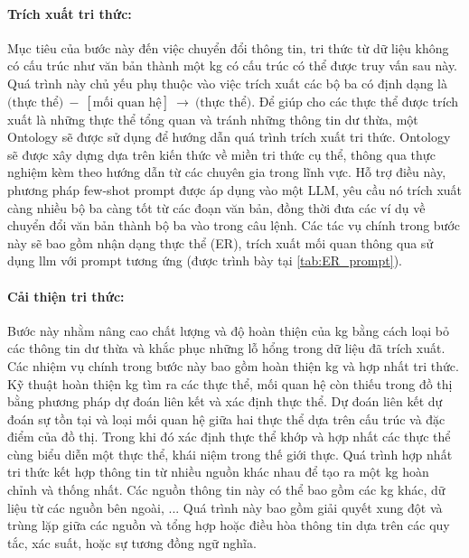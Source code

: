 \paragraph{Trích xuất tri thức:}
\label{paragraph:extract_knowledge}
Mục tiêu của bước này đến việc chuyển đổi thông tin, tri thức từ dữ liệu không có cấu trúc như văn bản thành một \gls{kg} có cấu trúc có thể được truy vấn sau này. Quá trình này chủ yếu phụ thuộc vào việc trích xuất các bộ ba có định dạng là \(
\text{(thực thể)} \ - \ \left[\text{mối quan hệ}\right] \ \rightarrow \ \text{(thực thể)}
\). Để giúp cho các thực thể được trích xuất là những thực thể tổng quan và tránh những thông tin dư thừa, một Ontology sẽ được sử dụng để hướng dẫn quá trình trích xuất tri thức. Ontology sẽ được xây dựng dựa trên kiến thức về miền tri thức cụ thể, thông qua thực nghiệm kèm theo hướng dẫn từ các chuyên gia trong lĩnh vực.
Hỗ trợ điều này, phương pháp few-shot prompt được áp dụng vào một LLM, yêu cầu nó trích xuất càng nhiều bộ ba càng tốt từ các đoạn văn bản, đồng thời đưa các ví dụ về chuyển đổi văn bản thành bộ ba vào trong câu lệnh. Các tác vụ chính trong bước này sẽ bao gồm nhận dạng thực thể (ER), trích xuất mối quan thông qua sử dụng \gls{llm} với prompt tương ứng (được trình bày tại \ref{tab:ER_prompt}).


\paragraph{Cải thiện tri thức:}
\label{paragraph:improve_knowledge}
Bước này nhằm nâng cao chất lượng và độ hoàn thiện của \gls{kg} bằng cách loại bỏ các thông tin dư thừa và khắc phục những lỗ hổng trong dữ liệu đã trích xuất. Các nhiệm vụ chính trong bước này bao gồm hoàn thiện \gls{kg} và hợp nhất tri thức.
Kỹ thuật hoàn thiện \gls{kg} tìm ra các thực thể, mối quan hệ còn thiếu trong đồ thị bằng phương pháp dự đoán liên kết và xác định thực thể. Dự đoán liên kết dự đoán sự tồn tại và loại mối quan hệ giữa hai thực thể dựa trên cấu trúc và đặc điểm của đồ thị. Trong khi đó xác định thực thể khớp và hợp nhất các thực thể cùng biểu diễn một thực thể, khái niệm trong thế giới thực.
Quá trình hợp nhất tri thức kết hợp thông tin từ nhiều nguồn khác nhau để tạo ra một \gls{kg} hoàn chỉnh và thống nhất. Các nguồn thông tin này có thể bao gồm các \gls{kg} khác, dữ liệu từ các nguồn bên ngoài, ... Quá trình này bao gồm giải quyết xung đột và trùng lặp giữa các nguồn và tổng hợp hoặc điều hòa thông tin dựa trên các quy tắc, xác suất, hoặc sự tương đồng ngữ nghĩa.


